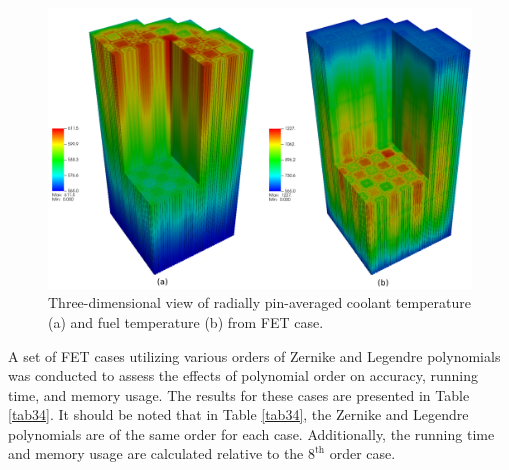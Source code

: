 \begin{figure}
    \centering
    \includegraphics[width=1.0\textwidth]{figs/fuel.pdf}
    \caption[Three-dimensional view of radially pin-averaged coolant and  fuel temperatures]{Three-dimensional view of radially pin-averaged coolant temperature (a) and fuel temperature (b) from FET case.}
    \label{fig_49}
\end{figure}

A set of FET cases utilizing various orders of Zernike and Legendre polynomials was conducted to assess the effects of polynomial order on accuracy, running time, and memory usage. The results for these cases are presented in Table \ref{tab34}. It should be noted that in Table \ref{tab34}, the Zernike and Legendre polynomials are of the same order for each case. Additionally, the running time and memory usage are calculated relative to the $8^\text{th}$ order case.

